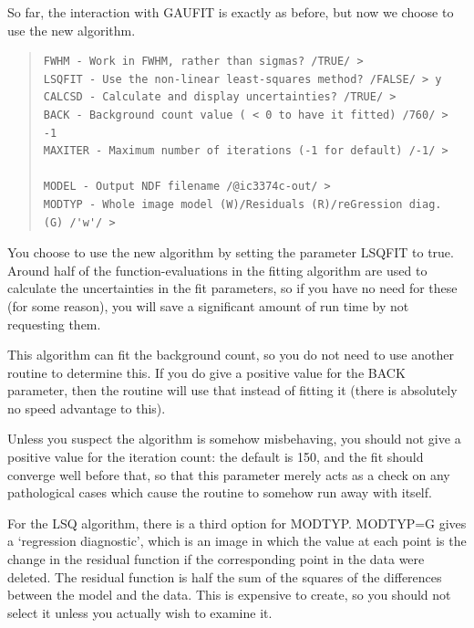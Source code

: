 \documentclass[twoside,11pt]{article}
\newenvironment{myquote}{\begin{quote}\begin{small}}{\end{small}\end{quote}}
\begin{document}
So far, the interaction with GAUFIT is exactly as before, but now we
choose to use the new algorithm.

\begin{myquote}
\begin{verbatim}
FWHM - Work in FWHM, rather than sigmas? /TRUE/ >
LSQFIT - Use the non-linear least-squares method? /FALSE/ > y
CALCSD - Calculate and display uncertainties? /TRUE/ >
BACK - Background count value ( < 0 to have it fitted) /760/ > -1
MAXITER - Maximum number of iterations (-1 for default) /-1/ >

MODEL - Output NDF filename /@ic3374c-out/ >
MODTYP - Whole image model (W)/Residuals (R)/reGression diag. (G) /'w'/ >
\end{verbatim}
\end{myquote}

You choose to use the new algorithm by setting the parameter LSQFIT to
true.  Around half of the function-evaluations in the fitting
algorithm are used to calculate the uncertainties in the fit
parameters, so if you have no need for these (for some reason), you
will save a significant amount of run time by not requesting them.

This algorithm can fit the background count, so you do not need to use
another routine to determine this.  If you do give a positive value
for the BACK parameter, then the routine will use that instead of
fitting it (there is absolutely no speed advantage to this).

Unless you suspect the algorithm is somehow misbehaving, you should
not give a positive value for the iteration count: the default is 150,
and the fit should converge well before that, so that this parameter
merely acts as a check on any pathological cases which cause the
routine to somehow run away with itself.

For the LSQ algorithm, there is a third option for MODTYP.  MODTYP=G
gives a `regression diagnostic', which is an image in which the value
at each point is the change in the residual function if the
corresponding point in the data were deleted.  The residual function
is half the sum of the squares of the differences between the model
and the data.  This is expensive to create, so you should not
select it unless you actually wish to examine it.
\end{document}
